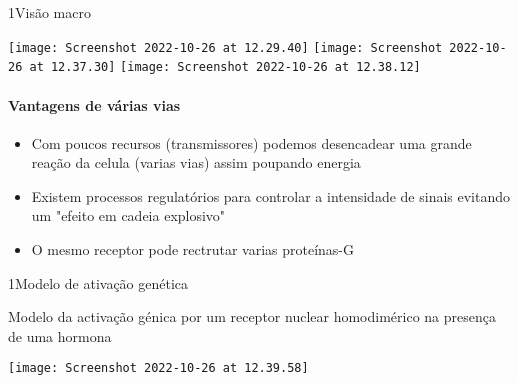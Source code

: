 \documentclass[\mainfilename]{subfiles}
\begin{document}
\begin{sectionBox}1{Visão macro} %
    
    \begin{center}
        \texttt{[image: Screenshot 2022-10-26 at 12.29.40]}
        \texttt{[image: Screenshot 2022-10-26 at 12.37.30]}
        \texttt{[image: Screenshot 2022-10-26 at 12.38.12]}
    \end{center}

    \paragraph*{Vantagens de várias vias}
    \begin{itemize}
        \item Com poucos recursos (transmissores) podemos desencadear uma grande reação da celula (varias vias) assim poupando energia
        \item Existem processos regulatórios para controlar a intensidade de sinais evitando um "efeito em cadeia explosivo"
        \item O mesmo receptor pode rectrutar varias proteínas-G
    \end{itemize}

    
\end{sectionBox}

\begin{sectionBox}1{Modelo de ativação genética} %
    
    Modelo da activação génica por um receptor nuclear homodimérico na presença de uma hormona

    \begin{center}
        \texttt{[image: Screenshot 2022-10-26 at 12.39.58]}
    \end{center}
    
\end{sectionBox}
\end{document}
